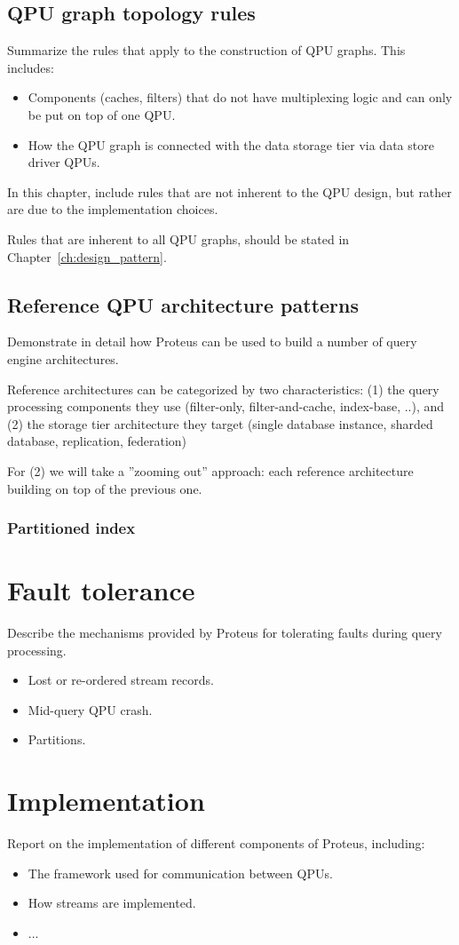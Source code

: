 \subsection{QPU graph topology rules}
Summarize the rules that apply to the construction of QPU graphs.
This includes:
\begin{itemize}
  \item Components (caches, filters) that do not have multiplexing logic and can
  only be put on top of one QPU.
  \item How the QPU graph is connected with the data storage tier via data store
  driver QPUs.
\end{itemize}

In this chapter, include rules that are not inherent to the QPU design, but
rather are due to the implementation choices.

Rules that are inherent to all QPU graphs, should be stated in
Chapter~\ref{ch:design_pattern}.


\subsection{Reference QPU architecture patterns}
Demonstrate in detail how Proteus can be used to build a number of query engine
architectures.

Reference architectures can be categorized by two characteristics: (1) the query
processing components they use (filter-only, filter-and-cache, index-base, ..),
and (2) the storage tier architecture they target (single database instance,
sharded database, replication, federation)

For (2) we will take a ''zooming out'' approach: each reference architecture
building on top of the previous one.

\subsubsection{Partitioned index}

\section{Fault tolerance}
Describe the mechanisms provided by Proteus for tolerating faults during query
processing.
\begin{itemize}
  \item Lost or re-ordered stream records.
  \item Mid-query QPU crash.
  \item Partitions.
\end{itemize}

\section{Implementation}
Report on the implementation of different components of Proteus, including:
\begin{itemize}
  \item The framework used for communication between QPUs.
  \item How streams are implemented.
  \item ...
\end{itemize}
